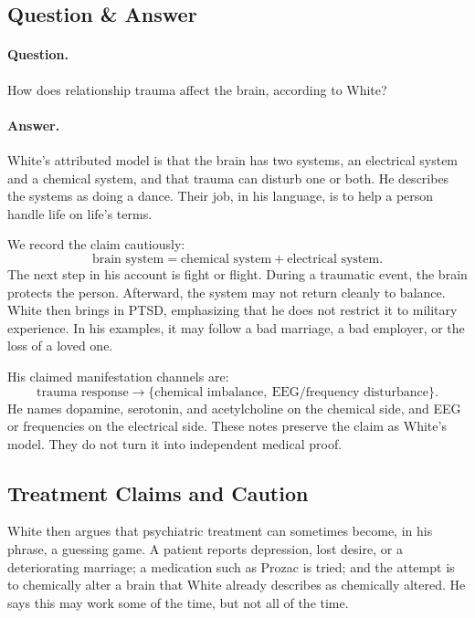 \subsection{Question \& Answer}

\paragraph{Question.} How does relationship trauma affect the brain, according to White?

\paragraph{Answer.} White's attributed model is that the brain has two systems, an electrical system and a chemical system, and that trauma can disturb one or both. He describes the systems as doing a dance. Their job, in his language, is to help a person handle life on life's terms.

We record the claim cautiously:
\begin{equation}
\text{brain system}
=
\text{chemical system}
+
\text{electrical system}.
\end{equation}
The next step in his account is fight or flight. During a traumatic event, the brain protects the person. Afterward, the system may not return cleanly to balance. White then brings in PTSD, emphasizing that he does not restrict it to military experience. In his examples, it may follow a bad marriage, a bad employer, or the loss of a loved one.

His claimed manifestation channels are:
\begin{equation}
\text{trauma response}
\longrightarrow
\{\text{chemical imbalance},\ \text{EEG/frequency disturbance}\}.
\end{equation}
He names dopamine, serotonin, and acetylcholine on the chemical side, and EEG or frequencies on the electrical side. These notes preserve the claim as White's model. They do not turn it into independent medical proof.

\subsection{Treatment Claims and Caution}

White then argues that psychiatric treatment can sometimes become, in his phrase, a guessing game. A patient reports depression, lost desire, or a deteriorating marriage; a medication such as Prozac is tried; and the attempt is to chemically alter a brain that White already describes as chemically altered. He says this may work some of the time, but not all of the time.

